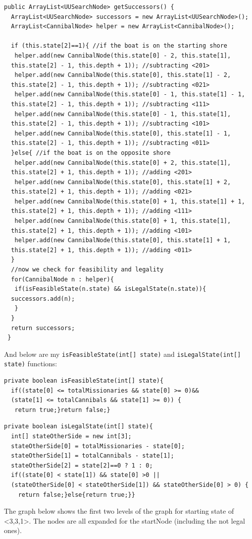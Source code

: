 \documentclass{article}
\begin{document}
\begin{lstlisting}
public ArrayList<UUSearchNode> getSuccessors() {
  ArrayList<UUSearchNode> successors = new ArrayList<UUSearchNode>();
  ArrayList<CannibalNode> helper = new ArrayList<CannibalNode>();

  if (this.state[2]==1){ //if the boat is on the starting shore
   helper.add(new CannibalNode(this.state[0] - 2, this.state[1],
  this.state[2] - 1, this.depth + 1)); //subtracting <201>
   helper.add(new CannibalNode(this.state[0], this.state[1] - 2,
  this.state[2] - 1, this.depth + 1)); //subtracting <021>
   helper.add(new CannibalNode(this.state[0] - 1, this.state[1] - 1,
  this.state[2] - 1, this.depth + 1)); //subtracting <111>
   helper.add(new CannibalNode(this.state[0] - 1, this.state[1],
  this.state[2] - 1, this.depth + 1)); //subtracting <101>
   helper.add(new CannibalNode(this.state[0], this.state[1] - 1,
  this.state[2] - 1, this.depth + 1)); //subtracting <011>
  }else{ //if the boat is on the opposite shore
   helper.add(new CannibalNode(this.state[0] + 2, this.state[1],
  this.state[2] + 1, this.depth + 1)); //adding <201>
   helper.add(new CannibalNode(this.state[0], this.state[1] + 2,
  this.state[2] + 1, this.depth + 1)); //adding <021>
   helper.add(new CannibalNode(this.state[0] + 1, this.state[1] + 1,
  this.state[2] + 1, this.depth + 1)); //adding <111>
   helper.add(new CannibalNode(this.state[0] + 1, this.state[1],
  this.state[2] + 1, this.depth + 1)); //adding <101>
   helper.add(new CannibalNode(this.state[0], this.state[1] + 1,
  this.state[2] + 1, this.depth + 1)); //adding <011>
  }
  //now we check for feasibility and legality
  for(CannibalNode n : helper){
   if(isFeasibleState(n.state) && isLegalState(n.state)){
  successors.add(n);
   }
  }
  return successors;
 }
\end{lstlisting}


And below are my \verb`isFeasibleState(int[] state)` and \verb`isLegalState(int[] state)` functions:


\begin{lstlisting}
private boolean isFeasibleState(int[] state){
  if((state[0] <= totalMissionaries && state[0] >= 0)&&
  (state[1] <= totalCannibals && state[1] >= 0)) {
   return true;}return false;}
\end{lstlisting}

\begin{lstlisting}
private boolean isLegalState(int[] state){
  int[] stateOtherSide = new int[3];
  stateOtherSide[0] = totalMissionaries - state[0];
  stateOtherSide[1] = totalCannibals - state[1];
  stateOtherSide[2] = state[2]==0 ? 1 : 0;
  if((state[0] < state[1]) && state[0] >0 ||
  (stateOtherSide[0] < stateOtherSide[1]) && stateOtherSide[0] > 0) {
  	return false;}else{return true;}}
\end{lstlisting}
\break
The graph below shows the first two levels of the graph for starting state of <3,3,1>. The nodes are all expanded for the startNode (including the not legal ones).
\end{document}
